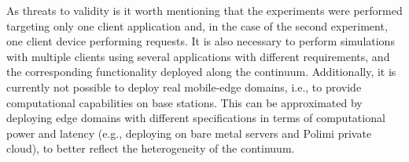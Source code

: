 


As threats to validity is it worth mentioning that the experiments were performed targeting only one client application and, in the case of the second experiment, one client device performing requests. It is also necessary to perform simulations with multiple clients using several applications with different requirements, and the corresponding functionality deployed along the continuum. Additionally, it is currently not possible to deploy real mobile-edge domains, i.e., to provide computational capabilities on base stations. This can be approximated by deploying edge domains with different specifications in terms of computational power and latency (e.g., deploying on bare metal servers and Polimi private cloud), to better reflect the heterogeneity of the continuum. 




